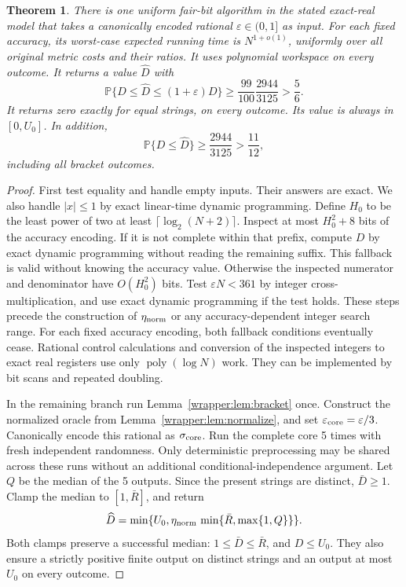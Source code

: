 \documentclass[11pt]{article}
\newtheorem{theorem}{Theorem}[section]
\theoremstyle{definition}
\newcommand{\Prb}{\mathbb P}
\newcommand{\eps}{\varepsilon}
\newcommand{\1}{\mathbf 1}
\begin{document}
\begin{theorem}\label{wrapper:thm:wrapper}
There is one uniform fair-bit algorithm in the stated exact-real model
that takes a canonically encoded rational $\eps\in(0,1]$ as input.
For each fixed accuracy, its worst-case expected running time is
$N^{1+o(1)}$, uniformly over all original metric costs and their ratios. It uses
polynomial workspace on every outcome. It returns a value $\widehat D$
with
\[
\Prb\{D\le\widehat D\le(1+\eps)D\}
\ge\frac{99}{100}\frac{2944}{3125}>\frac56.
\]
It returns zero exactly for equal strings, on every outcome. Its value is
always in $[0,U_0]$. In addition,
\[
\Prb\{D\le\widehat D\}\ge
\frac{2944}{3125}>\frac{11}{12},
\]
including all bracket outcomes.
\end{theorem}
\begin{proof}
First test equality and handle empty inputs. Their answers are exact.
We also handle $|x|\le1$ by exact linear-time dynamic programming.
Define $H_0$ to be the least power of two at least
$\lceil\log_2(N+2)\rceil$. Inspect at most $H_0^2+8$ bits of the
accuracy encoding. If it is not complete within that prefix, compute
$D$ by exact dynamic programming without reading the remaining suffix.
This fallback is valid without knowing the accuracy value.
Otherwise the inspected numerator and denominator have
$O(H_0^2)$ bits. Test $\eps N<361$ by integer cross-multiplication,
and use exact dynamic programming if the test holds. These steps precede
the construction of $\eta_{\rm norm}$ or any accuracy-dependent integer search range.
For each fixed accuracy encoding, both fallback conditions eventually
cease. Rational control calculations and conversion of the inspected
integers to exact real registers use only $\operatorname{poly}(\log N)$
work. They can be implemented by bit scans and repeated doubling.

In the remaining branch run Lemma~\ref{wrapper:lem:bracket} once. Construct the
normalized oracle from Lemma~\ref{wrapper:lem:normalize}, and set
$\varepsilon_{\rm core}=\eps/3$. Canonically encode this rational as $\sigma_{\rm core}$. Run the complete core 5 times with fresh independent
randomness. Only deterministic preprocessing may be shared across these
runs without an additional conditional-independence argument. Let $Q$
be the median of the 5 outputs. Since the present strings are distinct,
$\bar D\ge1$. Clamp the median to $[1,\bar R]$, and return
\[
\widehat D=\min\{U_0,\eta_{\rm norm}\,\min\{\bar R,\max\{1,Q\}\}\}.
\]
Both clamps preserve a successful median: $1\le\bar D\le\bar R$, and
$D\le U_0$. They also ensure a strictly positive finite output on
distinct strings and an output at most $U_0$ on every outcome.


\end{proof}
\end{document}
